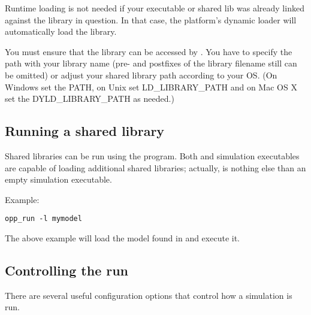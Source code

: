 \begin{note}
  Runtime loading is not needed if your executable or shared lib was
  already linked against the library in question. In that case,
  the platform's dynamic loader will automatically load the library.
\end{note}

\begin{note}
  You must ensure that the library can be accessed by {\opp} . You have to specify
  the path with your library name (pre- and postfixes of the library filename
  still can be omitted) or adjust your shared library path according to your OS.
  (On Windows set the PATH, on Unix set LD\_LIBRARY\_PATH and on Mac OS X
  set the DYLD\_LIBRARY\_PATH as needed.)
\end{note}

\subsection{Running a shared library}

Shared libraries can be run using the  program.
Both  and simulation executables are capable of
loading additional shared libraries; actually, 
is nothing else than an empty simulation executable.

Example:
\begin{verbatim}
opp_run -l mymodel
\end{verbatim}

The above example will load the model found in  and execute it.

\subsection{Controlling the run}

There are several useful configuration options that control how a simulation is run.

